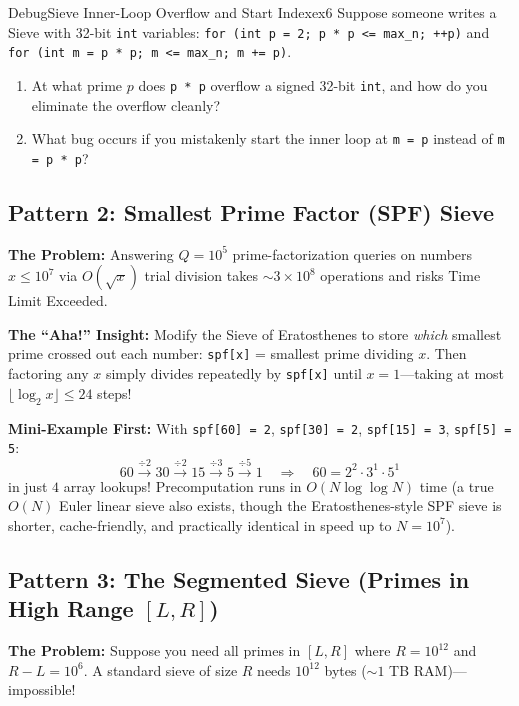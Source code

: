 \documentclass[11pt,a4paper]{article}
\theoremstyle{definition}
\newcommand{\painbeat}{\textbf{\color{accentamber}The Problem:} }
\newcommand{\ahabeat}{\textbf{\color{accentteal}The ``Aha!'' Insight:} }
\newcommand{\examplebeat}{\textbf{\color{primaryblue}Mini-Example First:} }
\begin{document}
\begin{tryitbox}{Debug}{Sieve Inner-Loop Overflow and Start Index}{ex6}
Suppose someone writes a Sieve with 32-bit \texttt{int} variables: \texttt{for (int p = 2; p * p <= max\_n; ++p)} and \texttt{for (int m = p * p; m <= max\_n; m += p)}.
\begin{enumerate}
    \item At what prime $p$ does \texttt{p * p} overflow a signed 32-bit \texttt{int}, and how do you eliminate the overflow cleanly?
    \item What bug occurs if you mistakenly start the inner loop at \texttt{m = p} instead of \texttt{m = p * p}?
\end{enumerate}
\end{tryitbox}

\subsection{Pattern 2: Smallest Prime Factor (SPF) Sieve}

\painbeat Answering $Q = 10^5$ prime-factorization queries on numbers $x \le 10^7$ via $O(\sqrt{x})$ trial division takes $\sim 3 \times 10^8$ operations and risks Time Limit Exceeded.

\ahabeat Modify the Sieve of Eratosthenes to store \emph{which} smallest prime crossed out each number: \texttt{spf[x]} = smallest prime dividing $x$. Then factoring any $x$ simply divides repeatedly by \texttt{spf[x]} until $x = 1$---taking at most $\lfloor \log_2 x \rfloor \le 24$ steps!

\examplebeat With \texttt{spf[60] = 2}, \texttt{spf[30] = 2}, \texttt{spf[15] = 3}, \texttt{spf[5] = 5}:
\[
    60 \xrightarrow{\div 2} 30 \xrightarrow{\div 2} 15 \xrightarrow{\div 3} 5 \xrightarrow{\div 5} 1
    \quad \Longrightarrow \quad
    60 = 2^2 \cdot 3^1 \cdot 5^1
\]
in just $4$ array lookups! Precomputation runs in $O(N \log\log N)$ time (a true $O(N)$ Euler linear sieve also exists, though the Eratosthenes-style SPF sieve is shorter, cache-friendly, and practically identical in speed up to $N = 10^7$).

\subsection{Pattern 3: The Segmented Sieve (Primes in High Range \texorpdfstring{$[L, R]$}{[L, R]})}

\painbeat Suppose you need all primes in $[L, R]$ where $R = 10^{12}$ and $R - L = 10^6$. A standard sieve of size $R$ needs $10^{12}$ bytes ($\sim 1$ TB RAM)---impossible!
\end{document}
